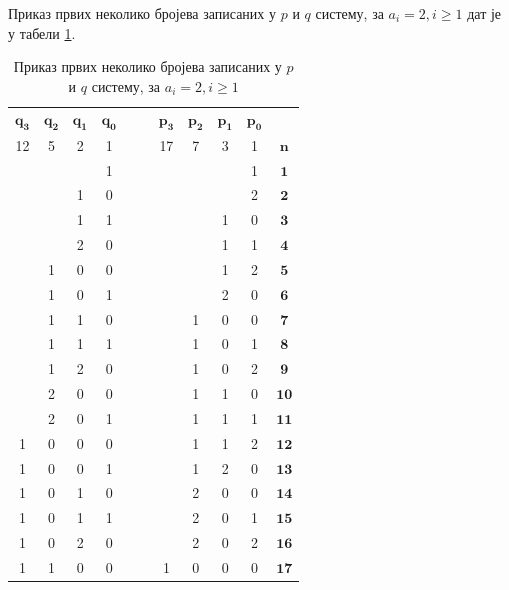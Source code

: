 \documentclass[a4paper]{article}
\begin{document}
Приказ првих неколико бројева записаних у $ p $ и $ q $ систему, за $ a_{i} = 2 , i \ge 1 $ дат је у табели \ref{tab:p_q_sistem}.

\begin{table}[h!]
	\caption{Приказ првих неколико бројева записаних у $ p $ и $ q $ систему, за $ a_{i} = 2 , i \ge 1 $}
	\label{tab:p_q_sistem}
	\begin{center}
		\begin{tabular}{ | c | c | c | c | c  c | c | c | c | c | c |}
			\hline
			{$ \mathbf{q_{3}} $} &  {$ \mathbf{q_{2}} $} &  {$ \mathbf{q_{1}} $} &  {$ \mathbf{q_{0}} $} & & &  {$ \mathbf{p_{3}} $} &  {$ \mathbf{p_{2}} $} &  {$ \mathbf{p_{1}} $} &  {$ \mathbf{p_{0}} $} &\\
			12 & 5 & 2 & 1 & & & 17 & 7 & 3 & 1 &  {$ \mathbf{n} $}\\
			\hline
			&  &  & 1 & & &  &  &  & 1 & {$ \mathbf{1} $}\\
			&  & 1 & 0 & & &  &  &  & 2 & {$ \mathbf{2} $}\\
			&  & 1 & 1 & & &  &  & 1 & 0 &  {$ \mathbf{3} $}\\
			&  & 2 & 0 & & &  &  & 1 & 1 &  {$ \mathbf{4} $}\\
			& 1 & 0 & 0 & & &  &  & 1 & 2 &  {$ \mathbf{5} $}\\
			& 1 & 0 & 1 & & &  &  & 2 & 0 &  {$ \mathbf{6} $}\\
			& 1 & 1 & 0 & & &  & 1 & 0 & 0 &  {$ \mathbf{7} $}\\
			& 1 & 1 & 1 & & &  & 1 & 0 & 1 &  {$ \mathbf{8} $}\\
			& 1 & 2 & 0 & & &  & 1 & 0 & 2 &  {$ \mathbf{9} $}\\
			& 2 & 0 & 0 & & &  & 1 & 1 & 0 &  {$ \mathbf{10} $}\\
			& 2 & 0 & 1 & & &  & 1 & 1 & 1 &  {$ \mathbf{11} $}\\
			 1 & 0 & 0 & 0 & & & & 1 & 1 & 2 &  {$ \mathbf{12} $}\\
			 1 & 0 & 0 & 1 & & & & 1 & 2 & 0 &  {$ \mathbf{13} $}\\
			 1 & 0 & 1 & 0 & & & & 2 & 0 & 0 &  {$ \mathbf{14} $}\\
			 1 & 0 & 1 & 1 & & & & 2 & 0 & 1 &  {$ \mathbf{15} $}\\
			 1 & 0 & 2 & 0 & & & & 2 & 0 & 2 &  {$ \mathbf{16} $}\\
			 1 & 1 & 0 & 0 & & & 1 & 0 & 0 & 0 &  {$ \mathbf{17} $}\\
			\hline 
		\end{tabular}
	\end{center}
\end{table}
\end{document}
